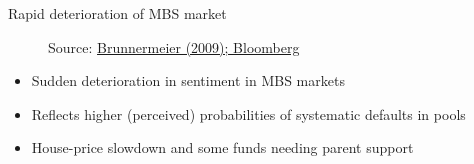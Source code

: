 

\begin{frame}{Rapid deterioration of MBS market}

\begin{figure}
\begin{center}


\caption{\label{fig:L4_ABX_indices}  Source: \href{https://www.princeton.edu/~markus/research/papers/liquidity_credit_crunch.pdf}{Brunnermeier (2009); Bloomberg}}

\end{center}
\end{figure}

\begin{itemize}
\item	Sudden deterioration in sentiment in MBS markets
\item	Reflects higher (perceived) probabilities of systematic defaults in pools
\item	House-price slowdown and some funds needing parent support
\end{itemize}

\end{frame}

